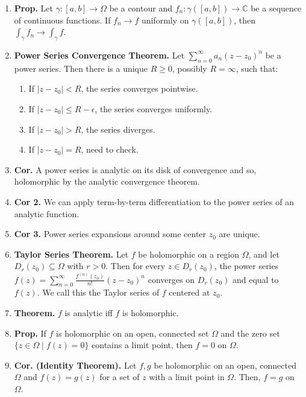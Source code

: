 \documentclass[12pt]{article}
\theoremstyle{definition}
\theoremstyle{named}
\begin{document}
{\begin{multicols}{2}
\begin{spacing}{1.01}
\begin{enumerate}
\begin{enumerate}
        \item $f_n'$ converges to $f'$ uniformly on every closed disk, and pointwise on $\Omega$. 
    \end{enumerate} 
    \item \textbf{Prop. } Let $\gamma: [a,b] \to \Omega$ be a contour and $f_n: \gamma([a,b]) \to \mathbb{C}$ be a sequence of continuous functions. If $f_n \to f$ uniformly on $\gamma([a,b])$, then $\int_\gamma f_n \to \int_\gamma f$. 
    \item \textbf{Power Series Convergence Theorem. } Let $\sum_{n=0}^{\infty} a_n(z-z_0)^n$ be a power series. Then there is a unique $R \geq 0$, possibly $R = \infty$, such that: 
    \begin{enumerate}
        \item If $|z-z_0| < R$, the series converges pointwise. 
        \item If $|z-z_0| \leq R - \epsilon$, the series converges uniformly. 
        \item If $|z-z_0| > R$, the series diverges. 
        \item If $|z-z_0| = R$, need to check. 
    \end{enumerate}
    \item \textbf{Cor. } A power series is analytic on its disk of convergence and so, holomorphic by the analytic convergence theorem. 
    \item \textbf{Cor 2. } We can apply term-by-term differentiation to the power series of an analytic function. 
    \item \textbf{Cor 3. } Power series expansions around some center $z_0$ are unique. 
    \item \textbf{Taylor Series Theorem. } Let $f$ be holomorphic on a region $\Omega$, and let $D_r(z_0) \subseteq \Omega$ with $r > 0$. Then for every $z \in D_r(z_0)$, the power series $f(z) = \sum_{n=0}^{\infty} \frac{f^{(n)}(z_0)}{n!}(z-z_0)^n$ converges on $D_r(z_0)$ and equal to $f(z)$. We call this the Taylor series of $f$ centered at $z_0$. 
    \item \textbf{Theorem. } $f$ is analytic iff $f$ is holomorphic. 
    \item \textbf{Prop. } If $f$ is holomorphic on an open, connected set $\Omega$ and the zero set $\{z \in \Omega \mid f(z) = 0\}$ contains a limit point, then $f=0$ on $\Omega$. 
    \item \textbf{Cor. (Identity Theorem). } Let $f,g$ be holomorphic on an open, connected $\Omega$ and $f(z)=g(z)$ for a set of $z$ with a limit point in $\Omega$. Then, $f=g$ on $\Omega$. 

\end{enumerate}
\end{spacing}
\end{multicols}}
\end{document}

